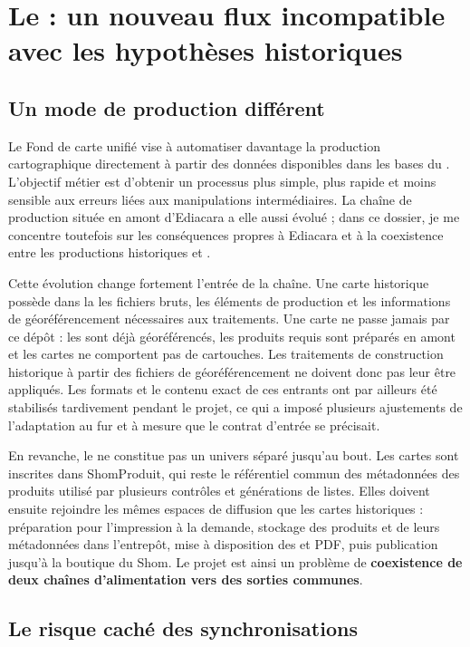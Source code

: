 \section{Le  : un nouveau flux incompatible avec les hypothèses historiques}

\subsection{Un mode de production différent}

Le Fond de carte unifié vise à automatiser davantage la production cartographique directement à partir des données disponibles dans les bases du . L'objectif métier est d'obtenir un processus plus simple, plus rapide et moins sensible aux erreurs liées aux manipulations intermédiaires. La chaîne de production située en amont d'Ediacara a elle aussi évolué ; dans ce dossier, je me concentre toutefois sur les conséquences propres à Ediacara et à la coexistence entre les productions historiques et .

Cette évolution change fortement l'entrée de la chaîne. Une carte historique possède dans la  les fichiers bruts, les éléments de production et les informations de géoréférencement nécessaires aux traitements. Une carte  ne passe jamais par ce dépôt : les  sont déjà géoréférencés, les produits requis sont préparés en amont et les cartes ne comportent pas de cartouches. Les traitements de construction historique à partir des fichiers de géoréférencement ne doivent donc pas leur être appliqués. Les formats et le contenu exact de ces entrants ont par ailleurs été stabilisés tardivement pendant le projet, ce qui a imposé plusieurs ajustements de l'adaptation au fur et à mesure que le contrat d'entrée se précisait.

En revanche, le  ne constitue pas un univers séparé jusqu'au bout. Les cartes sont inscrites dans ShomProduit, qui reste le référentiel commun des métadonnées des produits utilisé par plusieurs contrôles et générations de listes. Elles doivent ensuite rejoindre les mêmes espaces de diffusion que les cartes historiques : préparation pour l'impression à la demande, stockage des produits et de leurs métadonnées dans l'entrepôt, mise à disposition des  et PDF, puis publication jusqu'à la boutique du Shom. Le projet est ainsi un problème de \textbf{coexistence de deux chaînes d'alimentation vers des sorties communes}.

\subsection{Le risque caché des synchronisations}

